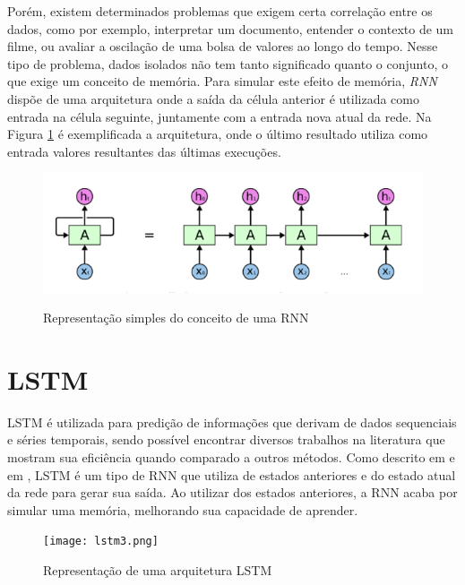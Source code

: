 Porém, existem determinados problemas que exigem certa correlação entre os dados, como por exemplo, interpretar um documento, entender o contexto de um filme, ou avaliar a oscilação de uma bolsa de valores ao longo do tempo. Nesse tipo de problema, dados isolados não tem tanto significado quanto o conjunto, o que exige um conceito de memória. Para simular este efeito de memória, \textit{\acrshort{RNN}} dispõe de uma arquitetura onde a saída da célula anterior é utilizada como entrada na célula seguinte, juntamente com a entrada nova atual da rede. Na Figura \ref{figure:rnn} é exemplificada a arquitetura, onde o último resultado utiliza como entrada valores resultantes das últimas execuções.

\begin{figure}[htb]
    \centering
    \includegraphics[scale=0.4]{rnnExample.png}
    \label{figure:rnn}
    \caption[Representação simples do conceito de um RNN]{Representação simples do conceito de uma RNN \footnotemark}
\end{figure}

\section{\acrfull{LSTM}}

\acrshort{LSTM} é utilizada para predição de informações que derivam de dados sequenciais e séries temporais, sendo possível encontrar diversos trabalhos na literatura que mostram sua eficiência quando comparado a outros métodos. Como descrito em \cite{Zainab_2018} e em \cite{Xiaolei_2015}, \acrshort{LSTM} é um tipo de \acrshort{RNN} que utiliza de estados anteriores e do estado atual da rede para gerar sua saída. Ao utilizar dos estados anteriores, a \acrshort{RNN} acaba por simular uma memória, melhorando sua capacidade de aprender. 

\begin{figure}[htb]
    \centering
    \texttt{[image: lstm3.png]}
    \label{figure:eixo}
    \caption[Representação de uma arquitetura LSTM]{Representação de uma arquitetura LSTM\footnotemark}
\end{figure}

